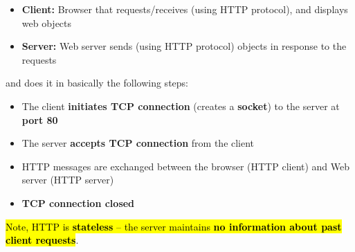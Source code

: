\documentclass[12pt,a4paper]{article}
\begin{document}
\begin{itemize}
  \item \textbf{Client:} Browser that requests/receives (using HTTP protocol), and displays web objects
  \item \textbf{Server:} Web server sends (using HTTP protocol) objects in response to the requests
\end{itemize}

\noindent{} and does it in basically the following steps:
\begin{itemize}
  \item The client \textbf{initiates TCP connection} (creates a \textbf{socket}) to the server at \textbf{port 80}
  \item The server \textbf{accepts TCP connection} from the client
  \item HTTP messages are exchanged between the browser (HTTP client) and Web server (HTTP server)
  \item \textbf{TCP connection closed}
\end{itemize}

\noindent \hl{Note, HTTP is \textbf{stateless} -- the server maintains \textbf{no information about past client requests}}. \\

\end{document}
